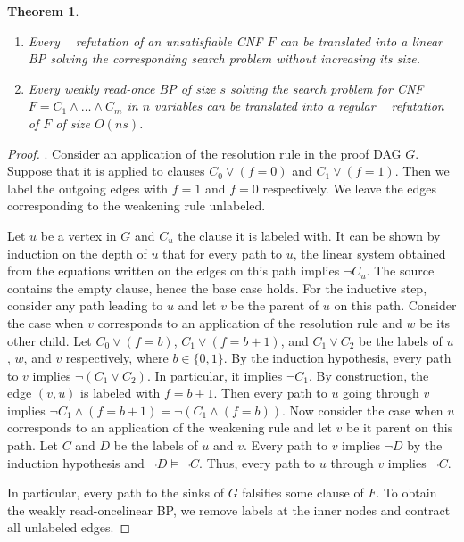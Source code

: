 \documentclass[10pt,a4paper]{article}
\newtheorem{theorem}{Theorem}
\theoremstyle{definition}
\theoremstyle{remark}
\DeclareMathOperator{\reslin}{\mathsf{Res}[\oplus]}
\newcommand{\wreadonce}{weakly read-once}
\begin{document}
\begin{theorem}\label{thm:res-bp}\leavevmode
  \begin{enumerate}
      \item Every $\reslin$ refutation of an unsatisfiable CNF $F$ can be translated into a linear BP solving the corresponding search problem without increasing its size.

      \item Every \wreadonce{} BP of size $s$ solving the search problem for CNF $F = C_1 \wedge \ldots \wedge C_m$ in $n$ variables can be translated into a regular $\reslin$ refutation of $F$ of size $O(ns)$.
%
  \end{enumerate}
%
\end{theorem}

\begin{proof}
   .
  Consider an application of the resolution rule in the proof DAG $G$. Suppose that it is applied to clauses $C_0 \lor (f = 0)$ and $C_1 \lor (f = 1)$. Then we label the outgoing edges with $f=1$ and $f=0$ respectively.
  We leave the edges corresponding to the weakening rule unlabeled.

  Let $u$ be a vertex in $G$ and $C_u$ the clause it is labeled with. It can be shown by induction on the depth of $u$ that for every path to $u$, the linear system obtained from the equations written on the edges on this path implies $\neg C_u$. The source contains the empty clause, hence the base case holds. For the inductive step, consider any path leading to $u$ and let $v$ be the parent of $u$ on this path. Consider the case when $v$ corresponds to an application of the resolution rule and $w$ be its other child. Let $C_0 \lor (f=b)$, $C_1 \lor (f=b+1)$, and $C_1 \lor C_2$ be the labels of $u$, $w$, and $v$ respectively, where $b \in \{0,1\}$. By the induction hypothesis, every path to $v$ implies $\neg (C_1 \lor C_2)$. In particular, it implies $\neg C_1$. By construction, the edge $(v, u)$ is labeled with $f=b+1$. Then every path to $u$ going through $v$ implies $\neg C_1 \land (f=b+1) = \neg (C_1 \land (f = b))$. Now consider the case when $u$ corresponds to an application of the weakening rule and let $v$ be it parent on this path. Let $C$ and $D$ be the labels of $u$ and $v$. Every path to $v$ implies $\neg D$ by the induction hypothesis and $\neg D \vDash \neg C$. Thus, every path to $u$ through $v$ implies $\neg C$.

  In particular, every path to the sinks of $G$ falsifies some clause of $F$. To obtain the \wreadonce linear BP, we remove labels at the inner nodes and contract all unlabeled edges.


\end{proof}
\end{document}
